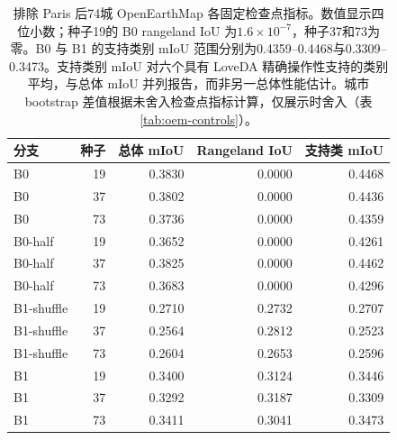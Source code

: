 \begin{table}[H]
\centering
\caption{排除 Paris 后74城 OpenEarthMap 各固定检查点指标。数值显示四位小数；种子19的 B0 rangeland IoU 为$1.6\times10^{-7}$，种子37和73为零。B0 与 B1 的支持类别 mIoU 范围分别为0.4359--0.4468与0.3309--0.3473。支持类别 mIoU 对六个具有 LoveDA 精确操作性支持的类别平均，与总体 mIoU 并列报告，而非另一总体性能估计。城市 bootstrap 差值根据未舍入检查点指标计算，仅展示时舍入（表\ref{tab:oem-controls}）。}
\label{tab:oem-seeds}
\small
\renewcommand{\arraystretch}{1.12}
\setlength{\tabcolsep}{4pt}
\begin{tabular*}{\linewidth}{@{\extracolsep{\fill}}lrrrr@{}}
\toprule
分支 & 种子 & 总体 mIoU & Rangeland IoU & 支持类 mIoU \\
\midrule
B0 & 19 & 0.3830 & 0.0000 & 0.4468 \\
B0 & 37 & 0.3802 & 0.0000 & 0.4436 \\
B0 & 73 & 0.3736 & 0.0000 & 0.4359 \\
B0-half & 19 & 0.3652 & 0.0000 & 0.4261 \\
B0-half & 37 & 0.3825 & 0.0000 & 0.4462 \\
B0-half & 73 & 0.3683 & 0.0000 & 0.4296 \\
B1-shuffle & 19 & 0.2710 & 0.2732 & 0.2707 \\
B1-shuffle & 37 & 0.2564 & 0.2812 & 0.2523 \\
B1-shuffle & 73 & 0.2604 & 0.2653 & 0.2596 \\
B1 & 19 & 0.3400 & 0.3124 & 0.3446 \\
B1 & 37 & 0.3292 & 0.3187 & 0.3309 \\
B1 & 73 & 0.3411 & 0.3041 & 0.3473 \\
\bottomrule
\end{tabular*}
\end{table}
